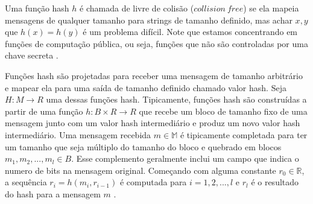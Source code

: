 \documentclass[12pt]{article}
\begin{document}
Uma função hash \(h\) é chamada de livre de colisão (\(collision\ free\)) se ela mapeia mensagens
de qualquer tamanho para strings de tamanho definido, mas achar \(x, y\) que \(h(x) = h(y)\) é um
problema difícil. Note que estamos concentrando em funções de computação pública, ou seja, funções
que não são controladas por uma chave secreta \cite{damgaard1989design}.


Funções hash são projetadas para receber uma mensagem de tamanho arbitrário e mapear ela para uma 
saída de tamanho definido chamado valor hash. Seja \(H : M \to R\) uma dessas funções hash. Tipicamente,
funções hash são construídas a partir de uma função \(h: B \times R \to R\) que recebe um bloco de tamanho
fixo de uma mensagem junto com um valor hash intermediário e produz um novo valor hash intermediário. Uma
mensagem recebida \(m \in \mathbb{M}\) é tipicamente completada para ter um tamanho que seja múltiplo do
tamanho do bloco e quebrado em blocos \(m_1, m_2, ... , m_l \in B\). Esse complemento geralmente inclui um
campo que indica o numero de bits na mensagem original. Começando com alguma constante \(r_0 \in \mathbb{R}\),
a sequência \(r_i = h(m_i, r_{i-1})\) é computada para \(i = 1, 2, ... , l\) e \(r_l\) é o resultado do hash
para a mensagem \(m\) \cite{van1999parallel}.

\end{document}
